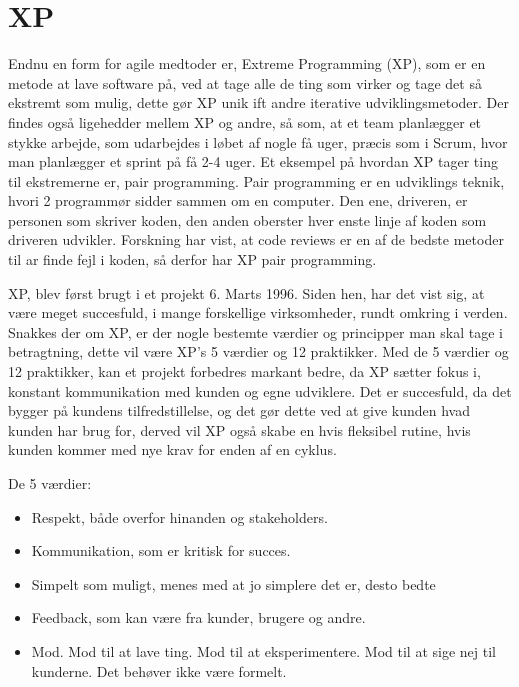 \section{XP}

Endnu en form for agile medtoder er, Extreme Programming (XP), som er en metode at lave software på, ved at tage alle de ting som virker og tage det så ekstremt som mulig, dette gør XP unik ift andre iterative udviklingsmetoder. Der findes også ligehedder mellem XP og andre, så som, at et team planlægger et stykke arbejde, som udarbejdes i løbet af nogle få uger, præcis som i Scrum, hvor man planlægger et sprint på få 2-4 uger. Et eksempel på hvordan XP tager ting til ekstremerne er, pair programming. Pair programming er en udviklings teknik, hvori 2 programmør sidder sammen om en computer. Den ene, driveren, er personen som skriver koden, den anden oberster hver enste linje af koden som driveren udvikler. Forskning har vist, at code reviews er en af de bedste metoder til ar finde fejl i koden, så derfor har XP pair programming.\cite{WhatisXP}

XP, blev først brugt i et projekt 6. Marts 1996. Siden hen, har det vist sig, at være meget succesfuld, i mange forskellige virksomheder, rundt omkring i verden. Snakkes der om XP, er der nogle bestemte værdier og principper man skal tage i betragtning, dette vil være XP’s 5 værdier og 12 praktikker. Med de 5 værdier og 12 praktikker, kan et projekt forbedres markant bedre, da XP sætter fokus i, konstant kommunikation med kunden og egne udviklere. Det er succesfuld, da det bygger på kundens tilfredstillelse, og det gør dette ved at give kunden hvad kunden har brug for, derved vil XP også skabe en hvis fleksibel rutine, hvis kunden kommer med nye krav for enden af en cyklus. 

De 5 værdier: 

\begin{itemize}
    \item Respekt, både overfor hinanden og stakeholders. 

    \item Kommunikation, som er kritisk for succes. 

    \item Simpelt som muligt, menes med at jo simplere det er, desto bedte 

    \item Feedback, som kan være fra kunder, brugere og andre. 

    \item Mod. Mod til at lave ting. Mod til at eksperimentere. Mod til at sige nej til kunderne. Det behøver ikke være formelt. 
\end{itemize}

